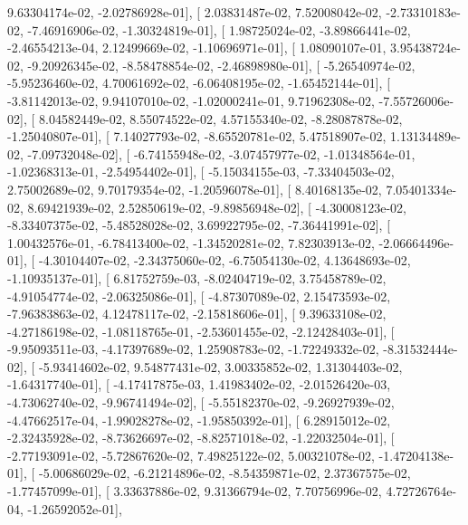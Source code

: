 \documentclass{article}
\begin{document}
          9.63304174e-02,  -2.02786928e-01],
       [  2.03831487e-02,   7.52008042e-02,  -2.73310183e-02,
         -7.46916906e-02,  -1.30324819e-01],
       [  1.98725024e-02,  -3.89866441e-02,  -2.46554213e-04,
          2.12499669e-02,  -1.10696971e-01],
       [  1.08090107e-01,   3.95438724e-02,  -9.20926345e-02,
         -8.58478854e-02,  -2.46898980e-01],
       [ -5.26540974e-02,  -5.95236460e-02,   4.70061692e-02,
         -6.06408195e-02,  -1.65452144e-01],
       [ -3.81142013e-02,   9.94107010e-02,  -1.02000241e-01,
          9.71962308e-02,  -7.55726006e-02],
       [  8.04582449e-02,   8.55074522e-02,   4.57155340e-02,
         -8.28087878e-02,  -1.25040807e-01],
       [  7.14027793e-02,  -8.65520781e-02,   5.47518907e-02,
          1.13134489e-02,  -7.09732048e-02],
       [ -6.74155948e-02,  -3.07457977e-02,  -1.01348564e-01,
         -1.02368313e-01,  -2.54954402e-01],
       [ -5.15034155e-03,  -7.33404503e-02,   2.75002689e-02,
          9.70179354e-02,  -1.20596078e-01],
       [  8.40168135e-02,   7.05401334e-02,   8.69421939e-02,
          2.52850619e-02,  -9.89856948e-02],
       [ -4.30008123e-02,  -8.33407375e-02,  -5.48528028e-02,
          3.69922795e-02,  -7.36441991e-02],
       [  1.00432576e-01,  -6.78413400e-02,  -1.34520281e-02,
          7.82303913e-02,  -2.06664496e-01],
       [ -4.30104407e-02,  -2.34375060e-02,  -6.75054130e-02,
          4.13648693e-02,  -1.10935137e-01],
       [  6.81752759e-03,  -8.02404719e-02,   3.75458789e-02,
         -4.91054774e-02,  -2.06325086e-01],
       [ -4.87307089e-02,   2.15473593e-02,  -7.96383863e-02,
          4.12478117e-02,  -2.15818606e-01],
       [  9.39633108e-02,  -4.27186198e-02,  -1.08118765e-01,
         -2.53601455e-02,  -2.12428403e-01],
       [ -9.95093511e-03,  -4.17397689e-02,   1.25908783e-02,
         -1.72249332e-02,  -8.31532444e-02],
       [ -5.93414602e-02,   9.54877431e-02,   3.00335852e-02,
          1.31304403e-02,  -1.64317740e-01],
       [ -4.17417875e-03,   1.41983402e-02,  -2.01526420e-03,
         -4.73062740e-02,  -9.96741494e-02],
       [ -5.55182370e-02,  -9.26927939e-02,  -4.47662517e-04,
         -1.99028278e-02,  -1.95850392e-01],
       [  6.28915012e-02,  -2.32435928e-02,  -8.73626697e-02,
         -8.82571018e-02,  -1.22032504e-01],
       [ -2.77193091e-02,  -5.72867620e-02,   7.49825122e-02,
          5.00321078e-02,  -1.47204138e-01],
       [ -5.00686029e-02,  -6.21214896e-02,  -8.54359871e-02,
          2.37367575e-02,  -1.77457099e-01],
       [  3.33637886e-02,   9.31366794e-02,   7.70756996e-02,
          4.72726764e-04,  -1.26592052e-01],
\end{document}
